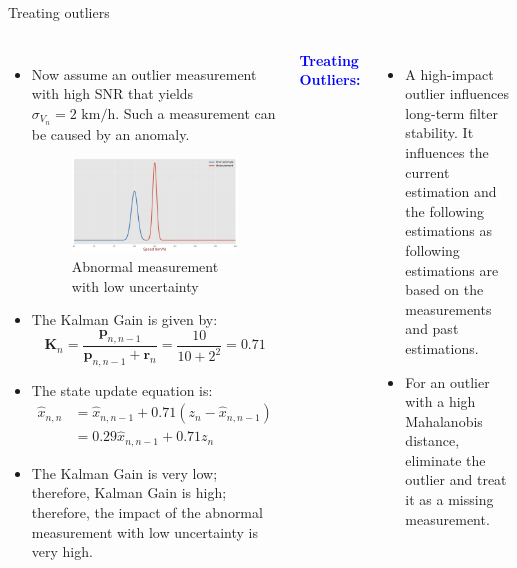 \begin{frame}{Treating outliers}
\begin{columns}
    \begin{itemize}
        \item Now assume an outlier measurement with high SNR that yields \( \sigma_{V_n} = 2 \text{ km/h} \). Such a measurement can be caused by an anomaly.
        \begin{figure}
            \centering
            \includegraphics[width=0.5\linewidth]{Figures//Part4/AbnormalMeasurementwithLowUncertainty.png}
            \vspace{-10pt}
            \caption{Abnormal measurement with low uncertainty}
            \vspace{-10pt}
        \end{figure}
        \item The Kalman Gain is given by:
        \[
        \bm{K}_n = \frac{\bm{p}_{n,n-1}}{\bm{p}_{n,n-1} + \bm{r}_n} = \frac{10}{10 + 2^2} = 0.71
        \]

        \item The state update equation is:
        \begin{align*}
            \hat{x}_{n,n} &= \hat{x}_{n,n-1} + 0.71 (z_n - \hat{x}_{n,n-1}) \\ &= 0.29 \hat{x}_{n,n-1} + 0.71 z_n
        \end{align*}
        \item The Kalman Gain is very low; therefore, Kalman Gain is high; therefore, the impact of the abnormal measurement with low uncertainty is very high.
    \end{itemize}

    \textcolor{blue}{\textbf{Treating Outliers:}}
    \begin{itemize}
        \item A high-impact outlier influences long-term filter stability. It influences the current estimation and the following estimations as following estimations are based on the measurements and past estimations.
        \item For an outlier with a high Mahalanobis distance, eliminate the outlier and treat it as a missing measurement.


\end{itemize}
\end{columns}
\end{frame}
